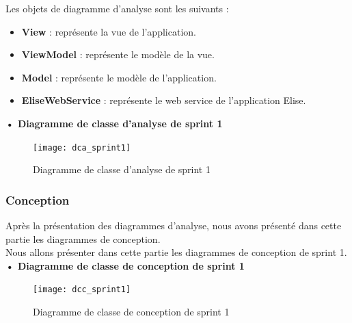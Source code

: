 Les objets de diagramme d'analyse sont les suivants :
\begin{itemize}
  \item \textbf{View} : représente la vue de l'application.
  \item \textbf{ViewModel} : représente le modèle de la vue.
  \item \textbf{Model} : représente le modèle de l'application.
  \item \textbf{EliseWebService} : représente le web service de l'application Elise.
\end{itemize}

\setlength{\parskip}{1em}
\setlength{\parindent}{0em}

\textbf{•	Diagramme de classe d'analyse de sprint 1 }


\begin{figure}[H]
  \centering
  \texttt{[image: dca\_sprint1]}
  \caption{Diagramme de classe d'analyse de sprint 1}
  \label{fig:class_analyse_auth}
\end{figure}


\subsubsection{Conception}

Après la présentation des diagrammes d'analyse, nous avons présenté dans cette partie les diagrammes de conception.\\ 
Nous allons présenter dans cette partie les diagrammes de conception de sprint 1. \\
\textbf{•	Diagramme de classe de conception de sprint 1}

\begin{figure}[H]
  \centering
  \texttt{[image: dcc\_sprint1]}
  \caption{Diagramme de classe de conception de sprint 1}
  \label{fig:class_diagram_auth}
\end{figure}


